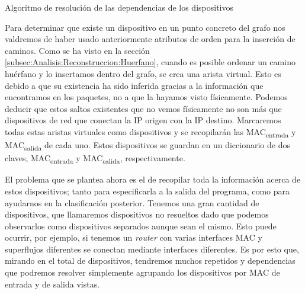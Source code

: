 \documentclass[tfg,epsbased,lof,lot,loa,final,nocopyright,overleaf]{tfgtfmthesisuam}
\begin{document}
\begin{algorithm}{}{Algoritmo de resolución de las dependencias de los dispositivos}
\end{algorithm}

Para determinar que existe un dispositivo en un punto concreto del grafo nos valdremos de haber usado anteriormente atributos de orden para la inserción de caminos. Como se ha visto en la sección \ref{subsec:Analisis:Reconstruccion:Huerfano}, cuando es posible ordenar un camino huérfano y lo insertamos dentro del grafo, se crea una arista virtual. Esto es debido a que su existencia ha sido inferida gracias a la información que encontramos en los paquetes, no a que la hayamos visto físicamente. Podemos deducir que estos saltos existentes que no vemos físicamente no son más que dispositivos de red que conectan la IP origen con la IP destino. Marcaremos todas estas aristas virtuales como dispositivos y se recopilarán las MAC\textsubscript{entrada} y MAC\textsubscript{salida} de cada uno. Estos dispositivos se guardan en un diccionario de dos claves, MAC\textsubscript{entrada} y MAC\textsubscript{salida}, respectivamente.

El problema que se plantea ahora es el de recopilar toda la información acerca de estos dispositivos; tanto para especificarla a la salida del programa, como para ayudarnos en la clasificación posterior. Tenemos una gran cantidad de dispositivos, que llamaremos dispositivos no resueltos dado que podemos observarlos como dispositivos separados aunque sean el mismo. Esto puede ocurrir, por ejemplo, si tenemos un \textit{router} con varias interfaces MAC y superflujos diferentes se conectan mediante interfaces diferentes. Es por esto que, mirando en el total de dispositivos, tendremos muchos repetidos y dependencias que podremos resolver simplemente agrupando los dispositivos por MAC de entrada y de salida vistas.
\end{document}
